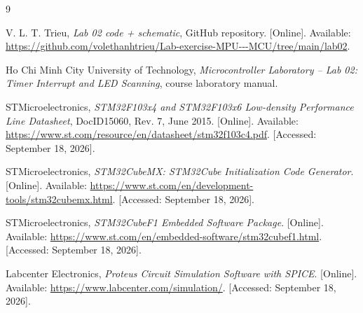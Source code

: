 \documentclass[a4paper]{article}
\begin{document}
\clearpage
{}
{}
\begin{thebibliography}{9}
\raggedright

V. L. T. Trieu,
\textit{Lab 02 code + schematic}, GitHub repository. [Online]. Available:
\url{https://github.com/volethanhtrieu/Lab-exercise-MPU---MCU/tree/main/lab02}.

Ho Chi Minh City University of Technology,
\textit{Microcontroller Laboratory -- Lab 02: Timer Interrupt and LED Scanning},
course laboratory manual.

STMicroelectronics,
\textit{STM32F103x4 and STM32F103x6 Low-density Performance Line Datasheet},
DocID15060, Rev. 7, June 2015. [Online]. Available:
\url{https://www.st.com/resource/en/datasheet/stm32f103c4.pdf}.
[Accessed: September 18, 2026].

STMicroelectronics,
\textit{STM32CubeMX: STM32Cube Initialization Code Generator}. [Online].
Available: \url{https://www.st.com/en/development-tools/stm32cubemx.html}.
[Accessed: September 18, 2026].

STMicroelectronics,
\textit{STM32CubeF1 Embedded Software Package}. [Online]. Available:
\url{https://www.st.com/en/embedded-software/stm32cubef1.html}.
[Accessed: September 18, 2026].

Labcenter Electronics,
\textit{Proteus Circuit Simulation Software with SPICE}. [Online]. Available:
\url{https://www.labcenter.com/simulation/}.
[Accessed: September 18, 2026].

\end{thebibliography}
\end{document}
